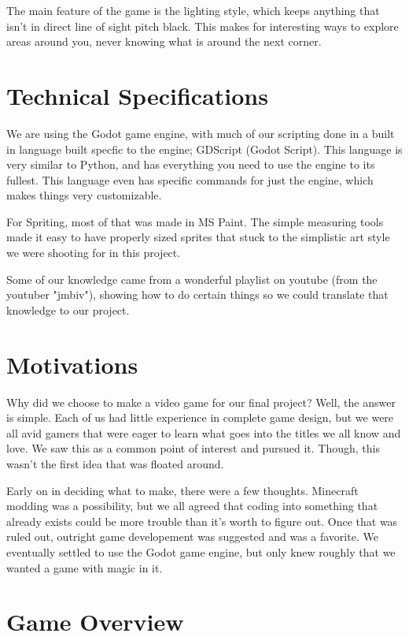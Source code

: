 \documentclass{sigchi}
\begin{document}
The main feature of the game is the lighting style, which keeps anything that isn't in direct line of sight pitch black. This makes for interesting
ways to explore areas around you, never knowing what is around the next corner.



\section{Technical Specifications}

We are using the Godot game engine\cite{godot}, with much of our scripting done in a built in language built specfic to the engine; GDScript (Godot Script).
This language is very similar to Python, and has everything you need to use the engine to its fullest. This language even has specific commands for just
the engine, which makes things very customizable.

For Spriting, most of that was made in MS Paint. The simple measuring tools made it easy to have properly sized sprites that stuck to the simplistic art style
we were shooting for in this project.

Some of our knowledge came from a wonderful playlist on youtube (from the youtuber "jmbiv"\cite{jmbiv}), showing how to do certain things so we could translate that knowledge to our project.



\section{Motivations}

Why did we choose to make a video game for our final project? Well, the answer is simple. Each of us had little experience in complete game design, but we were all avid gamers that were eager
to learn what goes into the titles we all know and love. We saw this as a common point of interest and pursued it. Though, this wasn't the first idea that was floated around.

Early on in deciding what to make, there were a few thoughts. Minecraft modding was a possibility, but we all agreed that coding into something that already exists could be more trouble than
it's worth to figure out. Once that was ruled out, outright game developement was suggested and was a favorite. We eventually settled to use the Godot game engine, but only knew roughly that
we wanted a game with magic in it.



\section{Game Overview}
\end{document}
